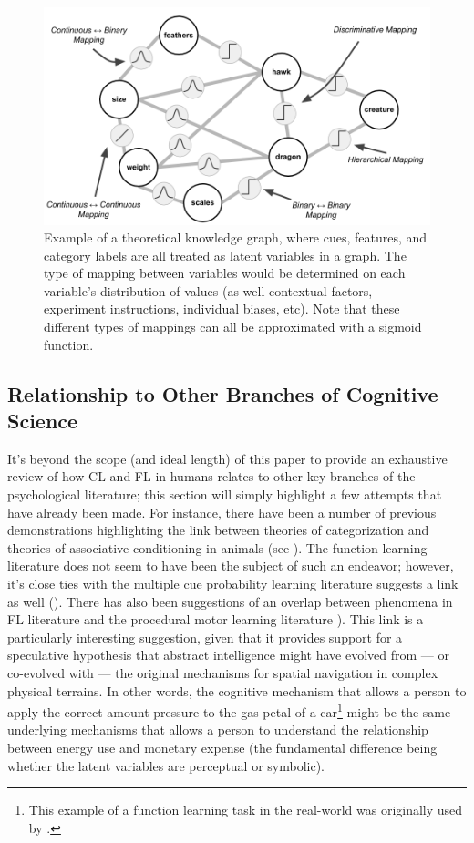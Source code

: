 \documentclass[12pt]{article}
\let\oldcite=\cite
\renewcommand{\cite}[1]{\textcolor[rgb]{0, .121, .388}{\oldcite{#1}}}
\begin{document}
\begin{figure}[H]
    \centering
    \includegraphics[scale=.4]{figures/knowledgeGraph.png}
    \caption{Example of a theoretical knowledge graph, where cues, features, and category labels are all treated as latent variables in a graph. The type of mapping between variables would be determined on each variable's distribution of values (as well contextual factors, experiment instructions, individual biases, etc). Note that these different types of mappings can all be approximated with a sigmoid function.}
    \label{fig:knowledgeGraph}
\end{figure}    

\subsection{Relationship to Other Branches of Cognitive Science}

It's beyond the scope (and ideal length) of this paper to provide an exhaustive review of how CL and FL in humans relates to other key branches of the psychological literature; this section will simply highlight a few attempts that have already been made. For instance, there have been a number of previous demonstrations highlighting the link between theories of categorization and theories of associative conditioning in animals (see \cite{kruschke2001toward,gluck1988conditioning}). The function learning literature does not seem to have been the subject of such an endeavor; however, it's close ties with the multiple cue probability learning literature suggests a link as well (\cite{kruschke1999model,busemeyer1997learning}). There has also been suggestions of an overlap between phenomena in FL literature and the procedural motor learning literature \cite{rosenbaum2001acquisition}). This link is a particularly interesting suggestion, given that it provides support for a speculative hypothesis that abstract intelligence might have evolved from --- or co-evolved with --- the original mechanisms for spatial navigation in complex physical terrains. In other words, the cognitive mechanism that allows a person to apply the correct amount pressure to the gas petal of a car\footnote{This example of a function learning task in the real-world was originally used by \cite{lucas2015rational}.} might be the same underlying mechanisms that allows a person to understand the relationship between energy use and monetary expense (the fundamental difference being whether the latent variables are perceptual or symbolic).
\end{document}
